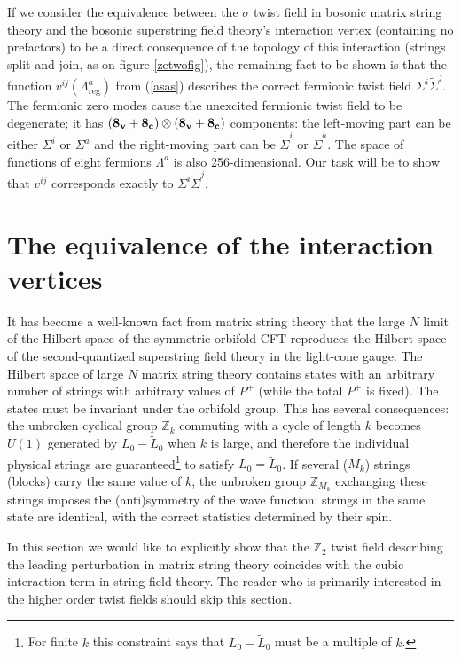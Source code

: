 \documentclass[nohyper,12pt,letterpaper]{JHEP3}
\def\IZ{{\mathbb Z}}           %
\def \tilde{\widetilde}
\def \eqref#1{(\ref{#1})}
\begin{document}
If we consider the equivalence between the $\sigma$ twist field in
bosonic matrix string theory and the bosonic superstring field
theory's interaction vertex (containing no prefactors) to be a direct
consequence of the topology of this interaction (strings split and
join, as on figure \ref{zetwofig}), the remaining fact to be shown is
that the function $v^{ij}(\Lambda^a_{\mathrm{reg}})$ from \eqref{asas}
describes the correct fermionic twist field
$\Sigma^i\tilde\Sigma^j$. The fermionic zero modes cause the unexcited
fermionic twist field to be degenerate; it has $({\bf 8_v}+{\bf
8_c})\otimes ({\bf 8_v}+{\bf 8_c})$ components: the left-moving part
can be either $\Sigma^i$ or $\Sigma^{\dot a}$ and the right-moving
part can be $\tilde\Sigma^i$ or $\tilde\Sigma^{\dot a}$.  The space of
functions of eight fermions $\Lambda^a$ is also 256-dimensional. Our
task will be to show that $v^{ij}$ corresponds exactly to
$\Sigma^i\tilde\Sigma^j$.




\section{The equivalence of the interaction vertices}

It has become a well-known fact from matrix string theory that the
large $N$ limit of the Hilbert space of the symmetric orbifold CFT
reproduces the Hilbert space of the second-quantized superstring field
theory in the light-cone gauge.  The Hilbert space of large $N$ matrix
string theory contains states with an arbitrary number of strings with
arbitrary values of $P^+$ (while the total $P^+$ is fixed). The states
must be invariant under the orbifold group. This has several
consequences: the unbroken cyclical group $\IZ_k$ commuting with a
cycle of length $k$ becomes $U(1)$ generated by $L_0-\tilde L_0$ when
$k$ is large, and therefore the individual physical strings are
guaranteed\footnote{For finite $k$ this constraint says that
$L_0-\tilde L_0$ must be a multiple of $k$.} to satisfy $L_0=\tilde
L_0$. If several ($M_k$) strings (blocks) carry the same value of $k$,
the unbroken group $\IZ_{M_k}$ exchanging these strings imposes the
(anti)symmetry of the wave function: strings in the same state are
identical, with the correct statistics determined by their spin.

In this section we would like to explicitly show that the $\IZ_2$ twist
field describing the leading perturbation in matrix string theory
coincides with the cubic interaction term in string field theory. The 
reader who is primarily interested in the higher order twist fields should 
skip this section.
\end{document}
